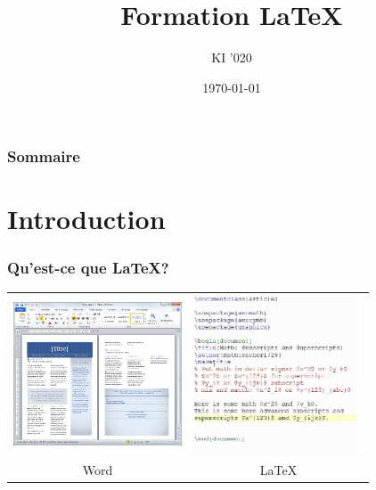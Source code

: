 \documentclass[handout]{beamer}
\title{Formation \LaTeX}
\author{KI '020}
\institute{\color{white}Ecole des Ponts Paristech}
\date{\today}
\begin{document}
	
	\begin{frame}
		\titlepage
	\end{frame}
	
	\begin{frame}
		\frametitle{Sommaire}
		\setcounter{tocdepth}{1}
		\tableofcontents
	\end{frame}
	
	\section{Introduction}
	
	\begin{frame}
		\frametitle{Qu'est-ce que \LaTeX ?}
		
		\begin{tabular}{cc}
			\includegraphics[width=5cm]{Images/Introduction/Word}&\includegraphics[width=5cm]{Images/Introduction/LaTeX}\\
			Word & \LaTeX
		\end{tabular}
		
	\end{frame}
	
\end{document}

